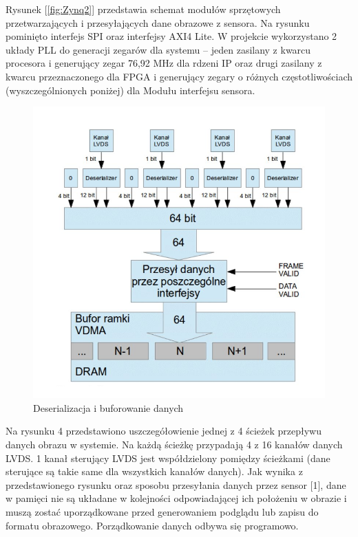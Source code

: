 \documentclass[a4paper,11pt,oneside]{book}  %
\begin{document}
 Rysunek [\ref{fig:Zynq2}] przedstawia schemat modułów sprzętowych przetwarzających i przesyłających dane obrazowe z sensora. Na rysunku pominięto interfejs SPI oraz interfejsy AXI4 Lite. W projekcie wykorzystano 2 układy PLL do generacji zegarów dla systemu – jeden zasilany z kwarcu procesora i generujący zegar 76,92 MHz dla rdzeni IP oraz drugi zasilany z kwarcu przeznaczonego dla FPGA i generujący zegary o różnych częstotliwościach (wyszczególnionych poniżej) dla Modułu interfejsu sensora.
 
\begin{figure}[H]
	\centering
	\includegraphics[width=14cm]{data2.png}
	\caption{Deserializacja i buforowanie danych}
	\label{fig:Zynq3}
\end{figure}

Na rysunku 4 przedstawiono uszczegółowienie jednej z 4 ścieżek przepływu danych obrazu w systemie. Na każdą ścieżkę przypadają 4 z 16 kanałów danych LVDS. 1 kanał sterujący LVDS jest współdzielony pomiędzy ścieżkami (dane sterujące są takie same dla wszystkich kanałów danych). Jak wynika z przedstawionego rysunku oraz sposobu przesyłania danych przez sensor [1], dane w pamięci nie są układane w kolejności odpowiadającej ich położeniu w obrazie i muszą zostać uporządkowane przed generowaniem podglądu lub zapisu do formatu obrazowego. Porządkowanie danych odbywa się programowo.
\end{document}
